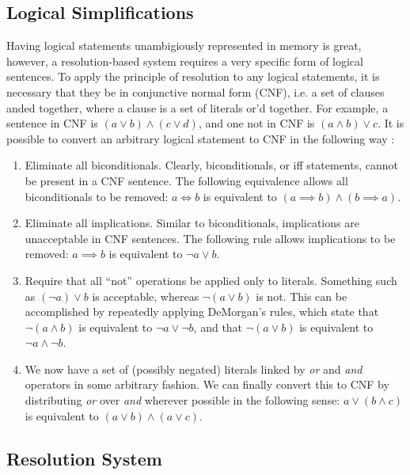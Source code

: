 \documentclass[english]{article}
\begin{document}
\subsection{Logical Simplifications}

Having logical statements unambigiously represented in memory is great,
however, a resolution-based system requires a very specific form of
logical sentences. To apply the principle of resolution to any logical
statements, it is necessary that they be in conjunctive normal form
(CNF), i.e. a set of clauses anded together, where a clause is a set
of literals or'd together. For example, a sentence in CNF is $\left(a\lor b\right)\land\left(c\lor d\right)$,
and one not in CNF is $\left(a\land b\right)\lor c$. It is possible
to convert an arbitrary logical statement to CNF in the following
way \cite{RussellNorvigAI}:
\begin{enumerate}
\item Eliminate all biconditionals. Clearly, biconditionals, or iff statements,
cannot be present in a CNF sentence. The following equivalence allows
all biconditionals to be removed: $a\iff b$ is equivalent to $\left(a\implies b\right)\land\left(b\implies a\right)$. 
\item Eliminate all implications. Similar to biconditionals, implications
are unacceptable in CNF sentences. The following rule allows implications
to be removed: $a\implies b$ is equivalent to $\lnot a\lor b$. 
\item Require that all {}``not'' operations be applied only to literals.
Something such as $\left(\lnot a\right)\lor b$ is acceptable, whereas
$\lnot\left(a\lor b\right)$ is not. This can be accomplished by repeatedly
applying DeMorgan's rules, which state that $\lnot\left(a\land b\right)$
is equivalent to $\lnot a\lor\lnot b$, and that $\lnot\left(a\lor b\right)$
is equivalent to $\lnot a\land\lnot b$.
\item We now have a set of (possibly negated) literals linked by \emph{or}
and \emph{and} operators in some arbitrary fashion. We can finally
convert this to CNF by distributing \emph{or }over \emph{and} wherever
possible in the following sense: $a\lor\left(b\land c\right)$ is
equivalent to $\left(a\lor b\right)\land\left(a\lor c\right)$. 
\end{enumerate}

\subsection{Resolution System}
\end{document}
